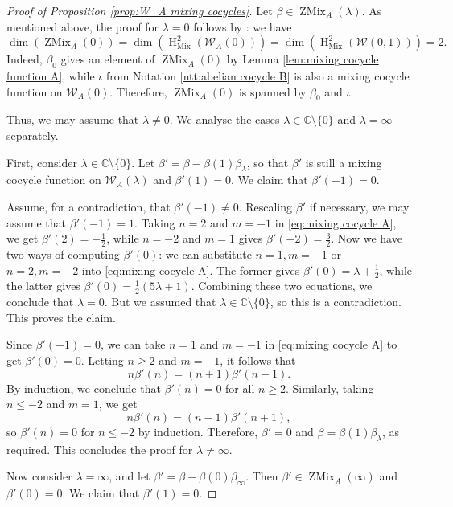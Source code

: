\documentclass[11pt, svgnames]{amsart}
\newcommand{\CC}{\mathbb{C}}
\newcommand{\W}{\mathcal{W}}
\DeclareMathOperator{\HH}{H}
\DeclareMathOperator{\Mix}{Mix}
\DeclareMathOperator{\ZMix}{ZMix}
\newcommand{\nonzero}{\setminus \{0\}}
\theoremstyle{definition}
\begin{document}
\begin{proof}[Proof of Proposition \ref{prop:W_A mixing cocycles}]
    Let $\beta \in \ZMix_A(\lambda)$. As mentioned above, the proof for $\lambda = 0$ follows by \cite[Theorem 2.3]{GaoJiangPei}: we have
    $$\dim(\ZMix_A(0)) = \dim(\HH_{\Mix}^2(\W_A(0))) = \dim(\HH^2_{\Mix} (\W(0,1))) = 2.$$
    Indeed, $\beta_0$ gives an element of $\ZMix_A(0)$ by Lemma \ref{lem:mixing cocycle function A}, while $\iota$ from Notation \ref{ntt:abelian cocycle B} is also a mixing cocycle function on $\W_A(0)$. Therefore, $\ZMix_A(0)$ is spanned by $\beta_0$ and $\iota$.
    
    Thus, we may assume that $\lambda \neq 0$. We analyse the cases $\lambda \in \CC\setminus\{0\}$ and $\lambda = \infty$ separately.

    First, consider $\lambda \in \CC \nonzero$. Let $\beta' = \beta - \beta(1)\beta_\lambda$, so that $\beta'$ is still a mixing cocycle function on $\W_A(\lambda)$ and $\beta'(1) = 0$. We claim that $\beta'(-1) = 0$.

    Assume, for a contradiction, that $\beta'(-1) \neq 0$. Rescaling $\beta'$ if necessary, we may assume that $\beta'(-1) = 1$. Taking $n = 2$ and $m = -1$ in \eqref{eq:mixing cocycle A}, we get $\beta'(2) = -\frac{1}{2}$, while $n = -2$ and $m = 1$ gives $\beta'(-2) = \frac{3}{2}$. Now we have two ways of computing $\beta'(0)$: we can substitute $n = 1, m = -1$ or $n = 2, m = -2$ into \eqref{eq:mixing cocycle A}. The former gives $\beta'(0) = \lambda + \frac{1}{2}$, while the latter gives $\beta'(0) = \frac{1}{2}(5\lambda + 1)$. Combining these two equations, we conclude that $\lambda = 0$. But we assumed that $\lambda \in \CC \nonzero$, so this is a contradiction. This proves the claim.

    Since $\beta'(-1) = 0$, we can take $n = 1$ and $m = -1$ in \eqref{eq:mixing cocycle A} to get $\beta'(0) = 0$. Letting $n \geq 2$ and $m = -1$, it follows that
    $$n\beta'(n) = (n + 1)\beta'(n - 1).$$
    By induction, we conclude that $\beta'(n) = 0$ for all $n \geq 2$. Similarly, taking $n \leq -2$ and $m = 1$, we get
    $$n\beta'(n) = (n - 1)\beta'(n + 1),$$
    so $\beta'(n) = 0$ for $n \leq -2$ by induction. Therefore, $\beta' = 0$ and $\beta = \beta(1)\beta_\lambda$, as required. This concludes the proof for $\lambda \neq \infty$.

    Now consider $\lambda = \infty$, and let $\beta' = \beta - \beta(0)\beta_\infty$. Then $\beta' \in \ZMix_A(\infty)$ and $\beta'(0) = 0$. We claim that $\beta'(1) = 0$.


\end{proof}
\end{document}
